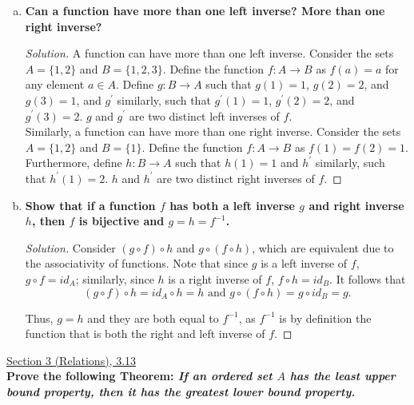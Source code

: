 \documentclass[11pt]{article}
\newenvironment{solution}
  {\renewcommand\qedsymbol{$\blacksquare$}\begin{proof}[Solution]}
  {\end{proof}}
\begin{document}
\begin{enumerate}[a)]
    \item \textbf{Can a function have more than one left inverse? More than one right inverse?}
    
    \begin{solution}
    A function can have more than one left inverse. Consider the sets $A = \{1, 2\}$ and $B = \{1, 2, 3\}$. 
    Define the function $f \colon A \rightarrow B$ as $f(a) = a$ for any element $a \in A$. Define $g \colon B \rightarrow A$ such that
    $g(1) = 1$, $g(2) = 2$, and $g(3) = 1$, and $g^{\prime}$ similarly, such that $g^{\prime}(1) = 1$, $g^{\prime}(2) = 2$, and $g^{\prime}(3) = 2$. 
    $g$ and $g^{\prime}$ are two distinct left inverses of $f$. \\

    Similarly, a function can have more than one right inverse. Consider the sets $A = \{1, 2\}$ and $B = \{1\}$. 
    Define the function $f \colon A \rightarrow B$ as $f(1) = f(2) = 1$. Furthermore, define $h \colon B \rightarrow A$ such that $h(1) = 1$ and $h^{\prime}$ similarly, such that $h^{\prime}(1) = 2$.
    $h$ and $h^{\prime}$ are two distinct right inverses of $f$.
    \end{solution}
    
    \item \textbf{Show that if a function $f$ has both a left inverse $g$ and right inverse $h$, then $f$ is bijective and $g = h = f^{-1}$.}

    \begin{solution}
    Consider $(g \circ f) \circ h$ and $g \circ (f \circ h)$, which are equivalent due to the associativity of functions. 
    Note that since $g$ is a left inverse of $f$, $g \circ f = id_A$; similarly, since $h$ is a right inverse of $f$, $f \circ h = id_B$. It follows that
    \[
      (g \circ f) \circ h = id_A \circ h = h \text{ and } g \circ (f \circ h) = g \circ id_B = g.
    \]

    Thus, $g = h$ and they are both equal to $f^{-1}$, as $f^{-1}$ is by definition the function that is both the right and left inverse of $f$.
    \end{solution}
\end{enumerate}

\newpage

\underline{Section 3 (Relations), 3.13} \\

\textbf{Prove the following Theorem: \textit{If an ordered set $A$ has the least upper bound property, then it has the greatest lower bound property.}}
\end{document}
